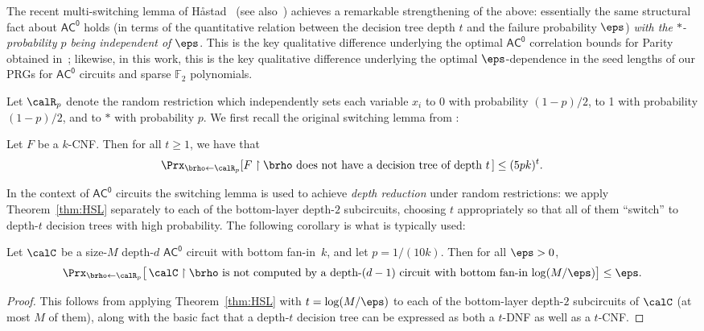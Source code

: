 \documentclass{toc}
\theoremstyle{plain}
\newcommand{\acz}{\mathsf{AC^0}}
\newcommand{\uhr}{\upharpoonright}
\renewcommand{\F}{\mathds{F}}
\begin{document}
The recent multi-switching lemma of H{\aa}stad~\cite{Has14} (see also~\cite{IMP12}) achieves a remarkable strengthening of the above: essentially the same structural fact about $\acz$ holds (in terms of the quantitative relation between the decision tree depth $t$ and the failure probability $\eps$) \emph{with the $\ast$-probability $p$ being independent of $\eps$}. This is the key qualitative difference underlying the optimal $\acz$ correlation bounds for {\sc Parity} obtained in~\cite{IMP12,Has14}; likewise, in this work, this is the key qualitative difference underlying the optimal $\eps$-dependence in the seed lengths of our PRGs for $\acz$ circuits and sparse $\F_2$ polynomials.\medskip 



Let $\calR_p$ denote the random restriction which independently sets each variable $x_i$ to $0$ with probability
$(1-p)/2$, to 1 with probability $(1-p)/2$, and to $\ast$ with probability $p.$  We first recall the original switching lemma
from \cite{Hastad86}:

\begin{theorem}
\label{thm:HSL}
Let $F$ be a $k$-CNF. Then for all $t \ge 1$, we have that 
\[ \Prx_{\brho\leftarrow\calR_p}[F\uhr\brho \text{~does not have a decision tree of depth~}t\, ] \le (5pk)^t. \] 
\end{theorem} 

In the context of $\acz$ circuits the switching lemma is used to achieve \emph{depth reduction} under random restrictions: we apply Theorem~\ref{thm:HSL} separately to each of the bottom-layer depth-$2$ subcircuits, choosing $t$ appropriately so that all of them ``switch'' to depth-$t$ decision trees with high probability.  The following corollary is what is typically used:

\begin{corollary}[$\acz$ depth reduction via Theorem~\ref{thm:HSL}]
\label{cor:HSL-depth-reduction} 
Let $\calC$ be a size-$M$ depth-$d$ $\acz$ circuit with bottom fan-in~$k$, and let $p = 1/(10k)$.  Then for all $\eps > 0$,
\[ \Prx_{\brho\leftarrow\calR_p}\big[\, \text{$\calC \uhr \brho$ is not computed by a depth-$(d-1)$ circuit with bottom fan-in $\log(M/\eps)$}\big] \le \eps.\] 
\end{corollary}

\begin{proof}
This follows from applying Theorem~\ref{thm:HSL} with $t = \log(M/\eps)$ to each of the bottom-layer depth-$2$ subcircuits of $\calC$ (at most $M$ of them), along with the basic fact that a depth-$t$ decision tree can be expressed as both a $t$-DNF as well as a $t$-CNF. 
\end{proof} 
\end{document}
